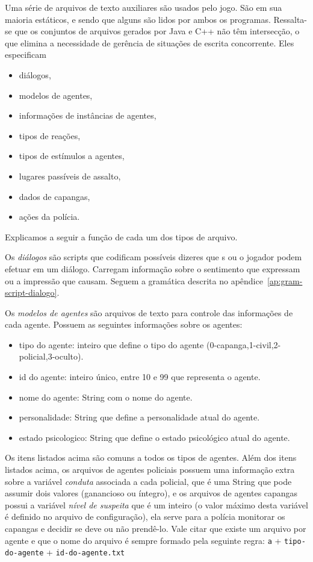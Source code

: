Uma série de arquivos de texto auxiliares são usados pelo
jogo. São em sua maioria estáticos, e sendo que alguns são lidos por ambos os programas. Ressalta-se que os conjuntos de arquivos gerados por Java e C++ não têm intersecção, o que elimina a necessidade de gerência de situações de escrita concorrente. Eles especificam
\begin{itemize}
\item diálogos,
\item modelos de agentes,
\item informações de instâncias de agentes,
\item tipos de reações,
\item tipos de estímulos a agentes,
\item lugares passíveis de assalto,
\item dados de capangas,
\item ações da polícia.
\end{itemize}

Explicamos a seguir a função de cada um dos tipos de arquivo.

Os \emph{diálogos} são scripts que codificam possíveis dizeres que
\npc{}s ou o jogador podem efetuar em um diálogo. Carregam informação sobre
o sentimento que expressam ou a impressão que causam. Seguem a
gramática descrita no apêndice~\ref{ap:gram-script-dialogo}.

Os \emph{modelos de agentes} são arquivos de texto para controle das informações de cada agente. Possuem as seguintes informações sobre os agentes:
\begin{itemize}
\item tipo do agente: inteiro que define o tipo do agente (0-capanga,1-civil,2-policial,3-oculto).
\item id do agente: inteiro único, entre 10 e 99 que representa o agente.
\item nome do agente: String com o nome do agente.
\item personalidade: String que define a personalidade atual do agente.
\item estado psicologico: String que define o estado psicológico atual do agente.
\end{itemize}
Os itens listados acima são comuns a todos os tipos de agentes.
Além dos itens listados acima, os arquivos de agentes policiais possuem uma informação extra sobre a variável \emph{conduta} associada a cada policial, que é uma String que pode assumir dois valores (ganancioso ou íntegro), e os arquivos de agentes capangas possui a variável \emph{nível de suspeita} que é um inteiro (o valor máximo desta variável é definido no arquivo de configuração), ela serve para a polícia monitorar os capangas e decidir se deve ou não prendê-lo.
Vale citar que existe um arquivo por agente e que o nome do arquivo é sempre formado pela seguinte regra: \verb!a! + \verb!tipo-do-agente! + \verb!id-do-agente.txt!

